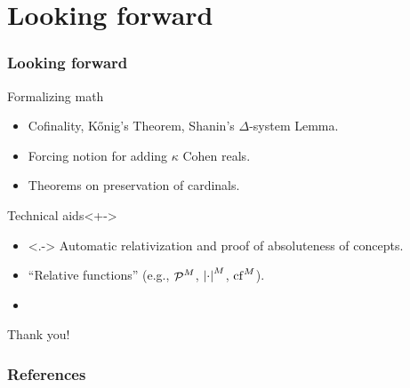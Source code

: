 \documentclass[english]{beamer}
\begin{document}
\section{Looking forward}

\begin{frame}
  \frametitle{Looking forward}
  \begin{block}{Formalizing math}
    \begin{itemize}
    \item<+-> Cofinality, K\H{o}nig's Theorem, Shanin's $\Delta$-system Lemma.
    \item<+-> Forcing notion for adding $\kappa$ Cohen reals.
    \item<+-> Theorems on preservation of cardinals.
    \end{itemize}
  \end{block}
  \begin{block}{Technical aids}<+->
    \begin{itemize}
    \item<.-> Automatic relativization and proof of absoluteness of concepts.
    \item<+-> ``Relative functions'' (e.g., $\P^M$, $\card{\cdot}^M$, $\cf^M$).
    \item<+-> 
    \end{itemize}
  \end{block}
\end{frame}

\begin{frame}
  \begin{shadowblock}{}
    \begin{center}
      {\Huge Thank you!}
    \end{center}
  \end{shadowblock}
\end{frame}

\begin{frame}
  \frametitle{References}
  
  
\end{frame}
\end{document}
